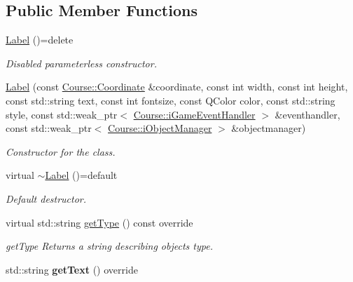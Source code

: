 \subsection*{Public Member Functions}
\begin{DoxyCompactItemize}
\item 
\hypertarget{class_student_1_1_label_a0a1b1bd7ef5ef1617bb3f4ecf13aa97e}{\hyperlink{class_student_1_1_label_a0a1b1bd7ef5ef1617bb3f4ecf13aa97e}{Label} ()=delete}\label{class_student_1_1_label_a0a1b1bd7ef5ef1617bb3f4ecf13aa97e}

\begin{DoxyCompactList}\small\item\em Disabled parameterless constructor. \end{DoxyCompactList}\item 
\hypertarget{class_student_1_1_label_a0b5c608faf0d743a7eb287280ab91585}{\hyperlink{class_student_1_1_label_a0b5c608faf0d743a7eb287280ab91585}{Label} (const \hyperlink{class_course_1_1_coordinate}{Course\-::\-Coordinate} \&coordinate, const int width, const int height, const std\-::string text, const int fontsize, const Q\-Color color, const std\-::string style, const std\-::weak\-\_\-ptr$<$ \hyperlink{class_course_1_1i_game_event_handler}{Course\-::i\-Game\-Event\-Handler} $>$ \&eventhandler, const std\-::weak\-\_\-ptr$<$ \hyperlink{class_course_1_1i_object_manager}{Course\-::i\-Object\-Manager} $>$ \&objectmanager)}\label{class_student_1_1_label_a0b5c608faf0d743a7eb287280ab91585}

\begin{DoxyCompactList}\small\item\em Constructor for the class. \end{DoxyCompactList}\item 
\hypertarget{class_student_1_1_label_a7d208c9df46a0e753ae355a21a335240}{virtual \hyperlink{class_student_1_1_label_a7d208c9df46a0e753ae355a21a335240}{$\sim$\-Label} ()=default}\label{class_student_1_1_label_a7d208c9df46a0e753ae355a21a335240}

\begin{DoxyCompactList}\small\item\em Default destructor. \end{DoxyCompactList}\item 
virtual std\-::string \hyperlink{class_student_1_1_label_a35e4181d3b859ce8008029b056b79b79}{get\-Type} () const override
\begin{DoxyCompactList}\small\item\em get\-Type Returns a string describing objects type. \end{DoxyCompactList}\item 
\hypertarget{class_student_1_1_label_acd03590c578a1774f799d2f3d8f8a00c}{std\-::string {\bfseries get\-Text} () override}\label{class_student_1_1_label_acd03590c578a1774f799d2f3d8f8a00c}


\end{DoxyCompactItemize}
